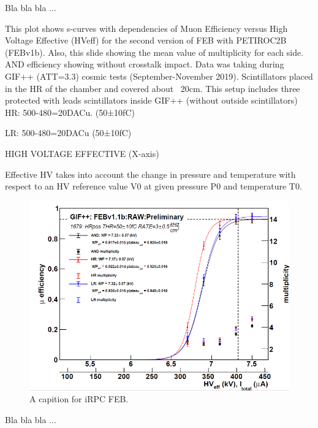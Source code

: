 Bla bla bla ...

This plot shows s-curves with dependencies of Muon Efficiency versus High Voltage Effective (HVeff) for the second version of FEB with PETIROC2B (FEBv1b). Also, this slide showing the mean value of multiplicity for each side. AND efficiency showing without crosstalk impact. Data was taking during GIF++ (ATT=3.3) cosmic tests (September-November 2019). Scintillators placed in the HR of the chamber and covered about ~20cm. This setup includes three protected with leads scintillators inside GIF++ (without outside scintillators)
HR: 500-480=20DACu. (50±10fC)

LR: 500-480=20DACu (50±10fC)

HIGH VOLTAGE EFFECTIVE (X-axis)

Effective HV takes into account the change in pressure and temperature with respect to an HV reference value V0 at given pressure P0 and temperature T0.

\begin{figure}
    \includegraphics[width=1\textwidth]{uioposter-images/irpc_feb_eff}
    \caption{A capition for iRPC FEB.}
    \label{irpc_feb}
\end{figure}

Bla bla bla ...